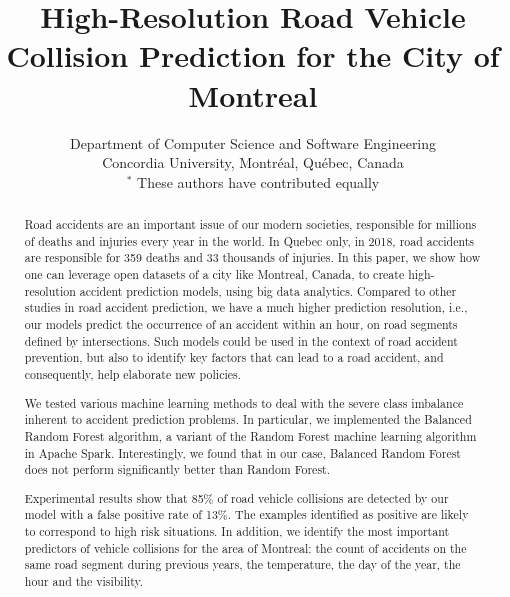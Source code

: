 \documentclass[conference]{IEEEtran}
\begin{document}
\title{High-Resolution Road Vehicle Collision Prediction for the City of Montreal}
\author{
Department of Computer Science and Software Engineering \\
Concordia University, Montréal, Québec, Canada\\
$^*$ These authors have contributed equally
}

\maketitle

\begin{abstract}

Road accidents are an important issue of our modern societies, responsible
for millions of deaths and injuries every year in the world. In Quebec only,
in 2018, road accidents are responsible for 359 deaths and 33 thousands of injuries.
In this paper, we show how one can leverage open datasets of a city like
Montreal, Canada, to create high-resolution accident prediction models, using
big data analytics.
Compared to other studies in road accident prediction, we have a much higher
prediction resolution, i.e., our models predict the occurrence of an accident
within an hour, on road segments defined by intersections.
Such models could be used in the context of road accident prevention, but also
to identify key factors that can lead to a road accident, and consequently, help
elaborate new policies.

We tested various machine learning methods to deal with the severe class imbalance inherent
to accident prediction problems. In particular, we implemented the Balanced Random Forest algorithm, a variant
of the Random Forest machine learning algorithm in Apache Spark. 
Interestingly, we found that in our case,
Balanced Random Forest does not perform significantly better than Random Forest.

Experimental results show that 85\% of road vehicle collisions are detected by our model with a false positive rate of 13\%. The examples identified as positive are likely to correspond to high risk situations.
In addition, we identify the most important predictors of vehicle collisions for the area of Montreal: the count of accidents on the same road segment during previous years, the temperature, the day of the year, the hour and the visibility.

\end{abstract}
\end{document}
